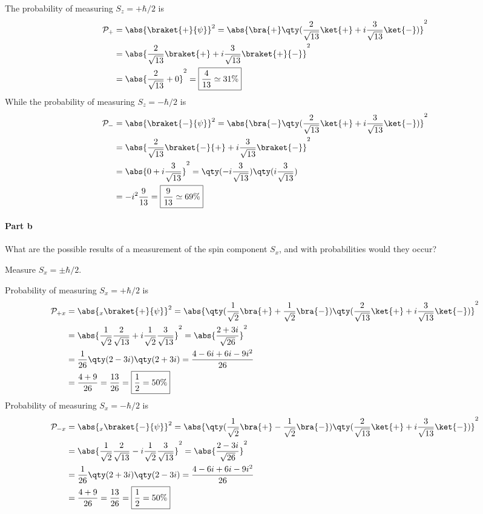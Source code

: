 \documentclass{article}
\begin{document}
		The probability of measuring $S_z = +\hbar/2$ is
		\begin{align*}
			\mathcal{P}_+ &= \abs{ \braket{+}{\psi} }^2 
			= \abs{ \bra{+} \qty( \frac{2}{\sqrt{13}} \ket{+} + i \frac{3}{\sqrt{13}} \ket{-} ) }^2 \\
			&= \abs{ \frac{2}{\sqrt{13}} \braket{+} + i \frac{3}{\sqrt{13}} \braket{+}{-} }^2\\
			&= \abs{ \frac{2}{\sqrt{13}} + 0 }^2 
			= \boxed{ \frac{4}{13} \simeq 31\% }
		\end{align*}
		While the probability of measuring $S_z = - \hbar/2$ is
		\begin{align*}
			\mathcal{P}_- &= \abs{ \braket{-}{\psi} }^2 
			= \abs{ \bra{-} \qty( \frac{2}{\sqrt{13}} \ket{+} + i \frac{3}{\sqrt{13}} \ket{-} ) }^2 \\
			&= \abs{ \frac{2}{\sqrt{13}} \braket{-}{+} + i \frac{3}{\sqrt{13}} \braket{-} }^2 \\
			&= \abs{ 0 + i \frac{3}{\sqrt{13}} }^2 
			= \qty( -i\frac{3}{\sqrt{13}} ) \qty( i \frac{3}{\sqrt{13}} ) \\
			&= -i^2 \frac{9}{13} 
			= \boxed{ \frac{9}{13} \simeq 69\% }
		\end{align*}
		
	\paragraph{Part b} What are the possible results of a measurement of the spin component $S_x$, and with probabilities would they occur?
		
		Measure $S_x = \pm \hbar/2$.
		
		Probability of measuring $S_x = +\hbar/2$ is
		\begin{align*}
			\mathcal{P}_{+x} &= \abs{ {}_x\braket{+}{\psi} }^2 
			= \abs{ \qty( \frac{1}{\sqrt{2}} \bra{+} +  \frac{1}{\sqrt{2}} \bra{-} ) \qty( \frac{2}{\sqrt{13}} \ket{+} + i \frac{3}{\sqrt{13}} \ket{-} ) }^2 \\
			&= \abs{ \frac{1}{\sqrt{2}} \frac{2}{\sqrt{13}} + i \frac{1}{\sqrt{2}} \frac{3}{\sqrt{13}} }^2 
			= \abs{ \frac{2 + 3i}{\sqrt{26}} }^2 \\
			&= \frac{1}{26} \qty( 2 - 3i ) \qty( 2+3i ) 
			= \frac{ 4 - 6i + 6i - 9i^2}{26} \\
			&= \frac{4 + 9}{26} 
			= \frac{13}{26} 
			= \boxed{ \frac{1}{2} = 50\% }
		\end{align*}
		Probability of measuring $S_x = -\hbar/2$ is
		\begin{align*}
			\mathcal{P}_{-x} &= \abs{ {}_x\braket{-}{\psi} }^2 
			= \abs{ \qty( \frac{1}{\sqrt{2}} \bra{+} -\frac{1}{\sqrt{2}} \bra{-} ) \qty( \frac{2}{\sqrt{13}} \ket{+} + i \frac{3}{\sqrt{13}} \ket{-} ) }^2 \\
			&= \abs{ \frac{1}{\sqrt{2}} \frac{2}{\sqrt{13}} - i \frac{1}{\sqrt{2}} \frac{3}{\sqrt{13}} }^2 
			= \abs{ \frac{2 - 3i}{\sqrt{26}} }^2 \\
			&= \frac{1}{26} \qty( 2 + 3i ) \qty( 2-3i ) 
			= \frac{ 4 - 6i + 6i - 9i^2}{26} \\
			&= \frac{4 + 9}{26} 
			= \frac{13}{26} 
			= \boxed{ \frac{1}{2} = 50\% }
		\end{align*}
		
\end{document}
